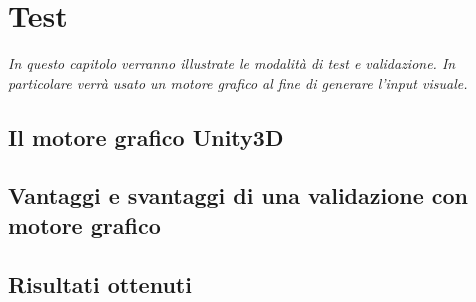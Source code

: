 \chapter{Test}
\label{chap:test}

\begin{minipage}{12cm}\textit{In questo capitolo verranno illustrate le modalità di test e validazione. In particolare verrà usato un motore grafico al fine di generare l'input visuale.}
\end{minipage}

\vspace*{1cm}

\section{Il motore grafico Unity3D}
\label{sec:unity}


\section{Vantaggi e svantaggi di una validazione con motore grafico}
\label{sec:valid}

\section{Risultati ottenuti}
\label{sec:perf}


